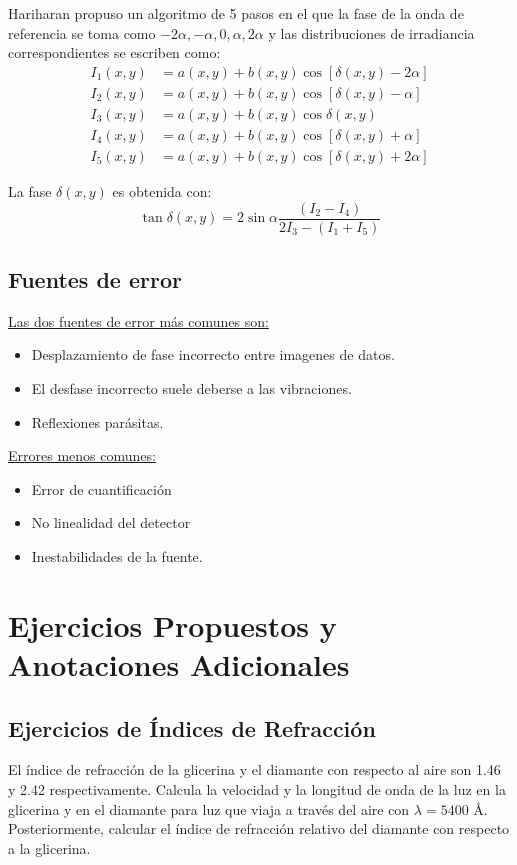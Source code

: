 \documentclass[12pt]{article}
\begin{document}
	Hariharan propuso un algoritmo de 5 pasos en el que la fase de la onda de referencia se toma como $-2\alpha, -\alpha, 0, \alpha, 2\alpha$ y las distribuciones de irradiancia correspondientes se escriben como:
	\begin{align*}
		I_1(x, y) &= a(x, y) + b(x, y) \cos[\delta(x,y) - 2\alpha] \\
		I_2(x, y) &= a(x, y) + b(x, y) \cos[\delta(x,y) - \alpha] \\
		I_3(x, y) &= a(x, y) + b(x, y) \cos\delta(x,y) \\
		I_4(x, y) &= a(x, y) + b(x, y) \cos[\delta(x,y) + \alpha] \\
		I_5(x, y) &= a(x, y) + b(x, y) \cos[\delta(x,y) + 2\alpha]
	\end{align*}
	
	La fase $\delta(x, y)$ es obtenida con:
	\begin{equation*}
		\tan \delta(x, y) = 2 \sin \alpha \frac{(I_2 - I_4)}{2I_3 - (I_1 + I_5)}
	\end{equation*}
	
	\subsection{Fuentes de error}
	\underline{Las dos fuentes de error más comunes son:}
	\begin{itemize}
		\item Desplazamiento de fase incorrecto entre imagenes de datos.
		\item El desfase incorrecto suele deberse a las vibraciones.
		\item Reflexiones parásitas.
	\end{itemize}
	
	\underline{Errores menos comunes:}
	\begin{itemize}
		\item Error de cuantificación
		\item No linealidad del detector
		\item Inestabilidades de la fuente.
	\end{itemize}
	
	\section{Ejercicios Propuestos y Anotaciones Adicionales}
	
	\subsection{Ejercicios de Índices de Refracción}
	El índice de refracción de la glicerina y el diamante con respecto al aire son 1.46 y 2.42 respectivamente. Calcula la velocidad y la longitud de onda de la luz en la glicerina y en el diamante para luz que viaja a través del aire con $\lambda = 5400 \text{ \AA}$. Posteriormente, calcular el índice de refracción relativo del diamante con respecto a la glicerina.
	
\end{document}
